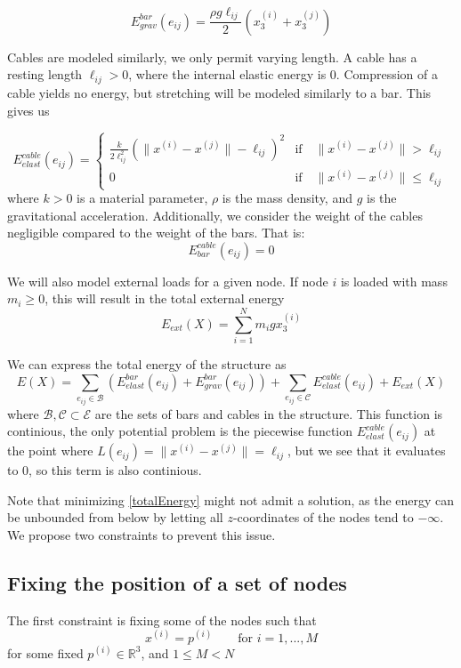 \documentclass[11pt]{article}
\newcommand{\el}{\ell_{ij}}
\newcommand{\xnorm}{\lVert x^{(i)} - x^{(j)}\rVert}
\newcommand{\e}{(e_{ij})}
\newcommand{\sumset}[1]{\sum\limits_{e_{ij} \in \mathcal{#1}}}
\newcommand{\ebe}{E^{bar}_{elast}(e_{ij})}
\newcommand{\ebg}{E^{bar}_{grav}(e_{ij})}
\newcommand{\ece}{E^{cable}_{elast}(e_{ij})}
\newcommand{\ee}{E_{ext}(X)}
\begin{document}
\begin{equation}
    \ebg = \frac{\rho g \el}{2}(x_3^{(i)}+x_3^{(j)})
    \label{barGrav}
\end{equation}

Cables are modeled similarly, we only permit varying length. A cable has a resting length $\el > 0$, where the internal elastic energy is $0$. Compression of a cable yields no energy, but stretching will be modeled similarly to a bar. This gives us

\begin{equation}
\ece = \begin{cases}
    \frac{k}{2\el^2}(\xnorm-\el)^2 & \text{if} \quad \xnorm >\el\\
    0 & \text{if} \quad \xnorm \leq \el
    \end{cases}
    \label{cableElast}
\end{equation}
where $k > 0$ is a material parameter, $\rho$ is the mass density, and $g$ is the gravitational acceleration. Additionally, we consider the weight of the cables negligible compared to the weight of the bars. That is:
\begin{equation}
    E^{cable}_{bar}\e = 0
    \label{cableGrav}
\end{equation}

We will also model external loads for a given node. If node $i$ is loaded with mass $m_i \geq 0$, this will result in the total external energy
\begin{equation}
    \ee = \sum_{i=1}^{N} m_i g x_3^{(i)}
    \label{externalEnergy}
\end{equation}

We can express the total energy of the structure as \begin{equation}
    E(X) = \sumset{B}(\ebe + \ebg) + \sumset{C} \ece + \ee
    \label{totalEnergy}
\end{equation} where $\mathcal{B}, \mathcal{C} \subset \mathcal{E}$ are the sets of bars and cables in the structure. This function is continious, the only potential problem is the piecewise function $\ece$ at the point where $L\e = \xnorm = \el$, but we see that it evaluates to $0$, so this term is also continious.

Note that minimizing \eqref{totalEnergy} might not admit a solution, as the energy can be unbounded from below by letting all $z$-coordinates of the nodes tend to $-\infty$. We propose two constraints to prevent this issue.

\subsection{Fixing the position of a set of nodes}
The first constraint is fixing some of the nodes such that
\begin{equation}
    x^{(i)} = p^{(i)} \qquad \text{for } i = 1,...,M
\end{equation} for some fixed $p^{(i)} \in \mathbb{R}^3$, and $1\leq M < N$
\end{document}
